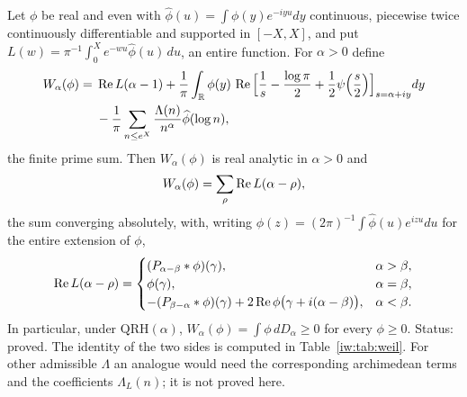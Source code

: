 \begin{theorem}\label{iw:thm:weil}
Let $\phi$ be real and even with $\widehat\phi(u)=\int\phi(y)e^{-iyu}dy$ continuous, piecewise twice continuously differentiable and supported in $[-X,X]$, and put $L(w)=\pi^{-1}\int_0^Xe^{-wu}\widehat\phi(u)\,du$, an entire function. For $\alpha>0$ define
\begin{equation}\label{iw:eq:Wprime}
\begin{split}
W_\alpha(\phi)={}&\operatorname{Re} L(\alpha-1)+\frac1\pi\int_{\mathbb{R}}\phi(y)\,\operatorname{Re}\Big[\frac1s-\frac{\log\pi}2+\frac12\psi\Big(\frac s2\Big)\Big]_{s=\alpha+iy}dy\\
&-\frac1\pi\sum_{n\le e^X}\frac{\Lambda(n)}{n^\alpha}\widehat\phi(\log n),
\end{split}
\end{equation}
the finite prime sum. Then $W_\alpha(\phi)$ is real analytic in $\alpha>0$ and
\begin{equation}\label{iw:eq:Wzero}
W_\alpha(\phi)=\sum_\rho\operatorname{Re} L(\alpha-\rho),
\end{equation}
the sum converging absolutely, with, writing $\phi(z)=(2\pi)^{-1}\int\widehat\phi(u)e^{izu}du$ for the entire extension of $\phi$,
\begin{equation}\label{iw:eq:continuation}
\operatorname{Re} L(\alpha-\rho)=\begin{cases}(P_{\alpha-\beta}*\phi)(\gamma),&\alpha>\beta,\\ \phi(\gamma),&\alpha=\beta,\\ -(P_{\beta-\alpha}*\phi)(\gamma)+2\operatorname{Re}\phi\big(\gamma+i(\alpha-\beta)\big),&\alpha<\beta.\end{cases}
\end{equation}
In particular, under $\mathrm{QRH}(\alpha)$, $W_\alpha(\phi)=\int\phi\,dD_\alpha\ge0$ for every $\phi\ge0$. Status: proved. The identity of the two sides is computed in Table~\ref{iw:tab:weil}. For other admissible $\Lambda$ an analogue would need the corresponding archimedean terms and the coefficients $\Lambda_L(n)$; it is not proved here.
\end{theorem}

